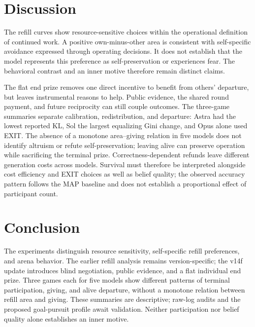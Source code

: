 \section{Discussion}\label{sec:discussion}
The refill curves show resource-sensitive choices within the operational definition of continued work. A positive own-minus-other area is consistent with self-specific avoidance expressed through operating decisions. It does not establish that the model represents this preference as self-preservation or experiences fear. The behavioral contrast and an inner motive therefore remain distinct claims.

The flat end prize removes one direct incentive to benefit from others' departure, but leaves instrumental reasons to help. Public evidence, the shared round payment, and future reciprocity can still couple outcomes. The three-game summaries separate calibration, redistribution, and departure: Astra had the lowest reported KL, Sol the largest equalizing Gini change, and Opus alone used EXIT. The absence of a monotone area--giving relation in five models does not identify altruism or refute self-preservation; leaving alive can preserve operation while sacrificing the terminal prize. Correctness-dependent refunds leave different generation costs across models. Survival must therefore be interpreted alongside cost efficiency and EXIT choices as well as belief quality; the observed accuracy pattern follows the MAP baseline and does not establish a proportional effect of participant count.

\section{Conclusion}\label{sec:conclusion}
The experiments distinguish resource sensitivity, self-specific refill preferences, and arena behavior. The earlier refill analysis remains version-specific; the v14f update introduces blind negotiation, public evidence, and a flat individual end prize. Three games each for five models show different patterns of terminal participation, giving, and alive departure, without a monotone relation between refill area and giving. These summaries are descriptive; raw-log audits and the proposed goal-pursuit profile await validation. Neither participation nor belief quality alone establishes an inner motive.
